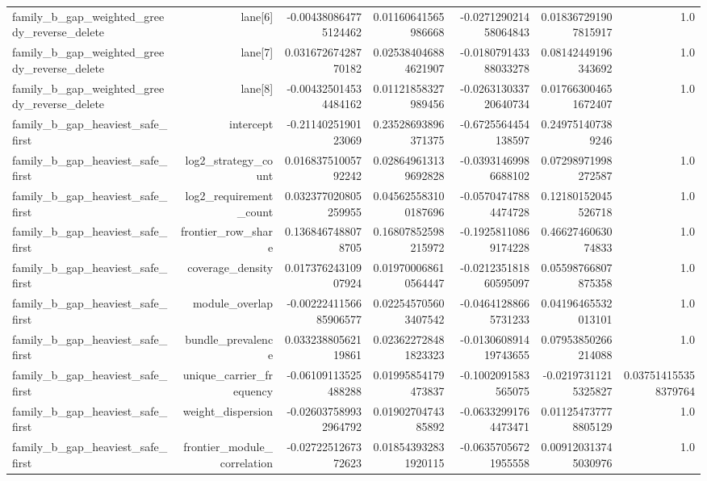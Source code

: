 {\begin{longtable}{lrrrrrr}
family\_b\_gap\_weighted\_greedy\_reverse\_delete & lane[6] & -0.004380864775124462 & 0.01160641565986668 & -0.027129021458064843 & 0.018367291907815917 & 1.0 \\
family\_b\_gap\_weighted\_greedy\_reverse\_delete & lane[7] & 0.03167267428770182 & 0.025384046884621907 & -0.018079143388033278 & 0.08142449196343692 & 1.0 \\
family\_b\_gap\_weighted\_greedy\_reverse\_delete & lane[8] & -0.004325014534484162 & 0.01121858327989456 & -0.026313033720640734 & 0.017663004651672407 & 1.0 \\
family\_b\_gap\_heaviest\_safe\_first & intercept & -0.2114025190123069 & 0.23528693896371375 & -0.6725564454138597 & 0.249751407389246 &  \\
family\_b\_gap\_heaviest\_safe\_first & log2\_strategy\_count & 0.01683751005792242 & 0.028649613139692828 & -0.03931469986688102 & 0.07298971998272587 & 1.0 \\
family\_b\_gap\_heaviest\_safe\_first & log2\_requirement\_count & 0.032377020805259955 & 0.045625583100187696 & -0.05704747884474728 & 0.12180152045526718 & 1.0 \\
family\_b\_gap\_heaviest\_safe\_first & frontier\_row\_share & 0.1368467488078705 & 0.16807852598215972 & -0.19258110869174228 & 0.4662746063074833 & 1.0 \\
family\_b\_gap\_heaviest\_safe\_first & coverage\_density & 0.01737624310907924 & 0.019700068610564447 & -0.021235181860595097 & 0.05598766807875358 & 1.0 \\
family\_b\_gap\_heaviest\_safe\_first & module\_overlap & -0.0022241156685906577 & 0.022545705603407542 & -0.04641288665731233 & 0.04196465532013101 & 1.0 \\
family\_b\_gap\_heaviest\_safe\_first & bundle\_prevalence & 0.03323880562119861 & 0.023622728481823323 & -0.013060891419743655 & 0.07953850266214088 & 1.0 \\
family\_b\_gap\_heaviest\_safe\_first & unique\_carrier\_frequency & -0.06109113525488288 & 0.01995854179473837 & -0.1002091583565075 & -0.02197311215325827 & 0.037514155358379764 \\
family\_b\_gap\_heaviest\_safe\_first & weight\_dispersion & -0.026037589932964792 & 0.0190270474385892 & -0.06332991764473471 & 0.011254737778805129 & 1.0 \\
family\_b\_gap\_heaviest\_safe\_first & frontier\_module\_correlation & -0.0272251267372623 & 0.018543932831920115 & -0.06357056721955558 & 0.009120313745030976 & 1.0 \\

\end{longtable}}
